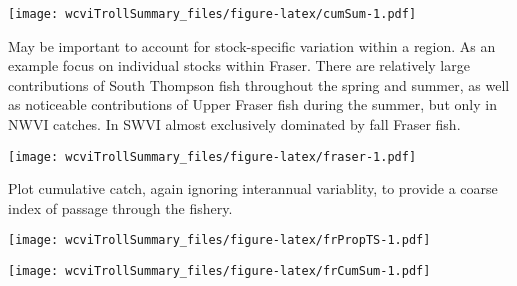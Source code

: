 \documentclass[]{article}
\begin{document}
\texttt{[image: wcviTrollSummary\_files/figure-latex/cumSum-1.pdf]}

May be important to account for stock-specific variation within a
region. As an example focus on individual stocks within Fraser. There
are relatively large contributions of South Thompson fish throughout the
spring and summer, as well as noticeable contributions of Upper Fraser
fish during the summer, but only in NWVI catches. In SWVI almost
exclusively dominated by fall Fraser fish.

\texttt{[image: wcviTrollSummary\_files/figure-latex/fraser-1.pdf]}

Plot cumulative catch, again ignoring interannual variablity, to provide
a coarse index of passage through the fishery.

\texttt{[image: wcviTrollSummary\_files/figure-latex/frPropTS-1.pdf]}

\texttt{[image: wcviTrollSummary\_files/figure-latex/frCumSum-1.pdf]}
\end{document}
